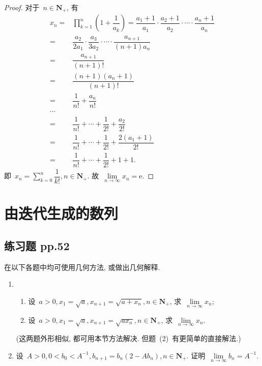 \documentclass[UTF8,a4paper,11pt,twoside]{book}
\newcommand{\e}{\mathrm e}
\begin{document}
\begin{enumerate}
	      \begin{proof}
		      对于~$n\in\mathbf{N}_{+}$, 有
		      \[
			      \begin{split}
				      x_n=& \prod_{k=1}^n \left(1+\dfrac{1}{a_k}\right)=\dfrac{a_1+1}{a_1}\cdot\dfrac{a_2+1}{a_2}\cdot\cdots\cdot\dfrac{a_n+1}{a_n}\\
				      =&\dfrac{a_2}{2a_1}\cdot\dfrac{a_3}{3a_2}\cdot\cdots\cdot\dfrac{a_{n+1}}{(n+1)a_n}\\
				      =&\dfrac{a_{n+1}}{(n+1)!}\\
				      =&\dfrac{(n+1)(a_n+1)}{(n+1)!}\\
				      =&\dfrac{1}{n!}+\dfrac{a_n}{n!}\\
				      \cdots&\\
				      =&\dfrac{1}{n!}+\cdots+\dfrac{1}{2!}+\dfrac{a_2}{2!}\\
				      =&\dfrac{1}{n!}+\cdots+\dfrac{1}{2!}+\dfrac{2(a_1+1)}{2!}\\
				      =&\dfrac{1}{n!}+\cdots+\dfrac{1}{2!}+1+1.
			      \end{split}
		      \]
		      即~$x_n=\sum\limits_{k=0}^{n}\dfrac{1}{k!}, n\in\mathbf{N}_{+}$. 故~$\lim\limits_{n\to\infty} x_n=\e$.\qedhere
	      \end{proof}
\end{enumerate}

\section{由迭代生成的数列}
\subsection{练习题 pp.52}
在以下各题中均可使用几何方法, 或做出几何解释.
\begin{enumerate}
	\item
	      \begin{enumerate}[(1)]
		      \item 设~$a>0, x_1=\sqrt{a}, x_{n+1}=\sqrt{a+x_n}, n\in\mathbf{N}_{+}$, 求~$\lim\limits_{n\to\infty} x_n$;
		      \item 设~$a>0, x_1=\sqrt{a}, x_{n+1}=\sqrt{ax_n}, n\in\mathbf{N}_{+}$, 求~$\lim\limits_{n\to\infty} x_n$.
	      \end{enumerate}
	      (这两题外形相似, 都可用本节方法解决. 但题~(2)~有更简单的直接解法.)

	\item 设~$A>0, 0<b_0<A^{-1}, b_{n+1}=b_n(2-Ab_n),n\in\mathbf{N}_{+}$. 证明~$\lim\limits_{n\to\infty} b_n=A^{-1}$.
\end{enumerate}
\end{document}
